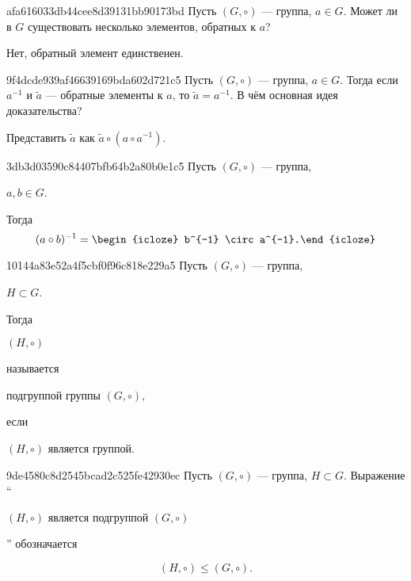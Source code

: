 \begin{note}{afa616033db44cee8d39131bb90173bd}
    Пусть \({ (G, \circ) }\) --- группа, \({ a \in G }\).
    Может ли в \({ G }\) существовать несколько элементов, обратных к \({ a }\)?

    \begin{cloze}{1}
        Нет, обратный элемент единственен.
    \end{cloze}
\end{note}

\begin{note}{9f4dcde939af46639169bda602d721c5}
    Пусть \({ (G, \circ)}\) --- группа, \({ a \in G }\).
    Тогда если \({ a^{-1} }\) и \({ \tilde a }\) --- обратные элементы к \({ a }\), то \({ \tilde a = a^{-1} }\). В чём основная идея доказательства?

    \begin{cloze}{1}
        Представить \({ \tilde a }\) как \({ \tilde a \circ \left( a \circ a^{-1} \right) }\).
    \end{cloze}
\end{note}

\begin{note}{3db3d03590c84407bfb64b2a80b0e1c5}
    Пусть \({ (G, \circ) }\) --- группа, \begin{icloze}{2}\({ a, b \in G }\).\end{icloze} Тогда
    \[
        (a \circ b)^{-1} =  \begin{icloze}{1}b^{-1} \circ a^{-1}.\end{icloze}
    \]
\end{note}

\begin{note}{10144a83e52a4f5cbf0f96c818e229a5}
    Пусть \({ (G, \circ) }\) --- группа, \begin{icloze}{3}\({ H \subset G }\).\end{icloze}
    Тогда \begin{icloze}{4}\({ (H, \circ) }\)\end{icloze} называется \begin{icloze}{2}подгруппой группы \({ (G, \circ) }\),\end{icloze} если \begin{icloze}{1}\({ (H, \circ) }\) является группой.\end{icloze}
\end{note}

\begin{note}{9de4580c8d2545bcad2c525fe42930ec}
    Пусть \({ (G, \circ) }\) --- группа, \({ H \subset G }\).
    Выражение ``\begin{icloze}{2}\({ (H, \circ) }\) является подгруппой \({ (G, \circ) }\)\end{icloze}'' обозначается
    \begin{icloze}{1}
        \[
            (H, \circ) \leqslant (G, \circ).
        \]
    \end{icloze}
\end{note}

